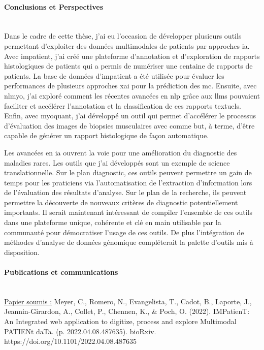 \paragraph{\textbf{Conclusions et Perspectives}}\mbox{}\\

Dans le cadre de cette thèse, j’ai eu l’occasion de développer plusieurs outils permettant d’exploiter des données multimodales de patients par approches \gls{ia}. Avec \gls{impatient}, j’ai créé une plateforme d’annotation et d’exploration de rapports histologiques de patients qui a permis de numériser une centaine de rapports de patients. La base de données d'\gls{impatient} a été utilisée pour évaluer les performances de plusieurs approches \gls{xai} pour la prédiction des \gls{mc}. Ensuite, avec \gls{nlmyo}, j’ai exploré comment les récentes avancées en \gls{nlp} grâce aux \gls{llms} pouvaient faciliter et accélérer l’annotation et la classification de ces rapports textuels. Enfin, avec \gls{myoquant}, j’ai développé un outil qui permet d’accélérer le processus d’évaluation des images de biopsies musculaires avec comme but, à terme, d’être capable de générer un rapport histologique de façon automatique.

Les avancées en \gls{ia} ouvrent la voie pour une amélioration du diagnostic des maladies rares. Les outils que j’ai développés sont un exemple de science translationnelle. Sur le plan diagnostic, ces outils peuvent permettre un gain de temps pour les praticiens via l’automatisation de l’extraction d’information lors de l’évaluation des résultats d’analyse. Sur le plan de la recherche, ils peuvent permettre la découverte de nouveaux critères de diagnostic potentiellement importants. Il serait maintenant intéressant de compiler l’ensemble de ces outils dans une plateforme unique, cohérente et clé en main utilisable par la communauté pour démocratiser l’usage de ces outils. De plus l’intégration de méthodes d’analyse de données génomique compléterait la palette d’outils mis à disposition.

\paragraph{\textbf{Publications et communications}}\mbox{}\\

\underline{Papier soumis :} Meyer, C., Romero, N., Evangelista, T., Cadot, B., Laporte, J., Jeannin-Girardon, A., Collet, P., Chennen, K., \& Poch, O. (2022). IMPatienT: An Integrated web application to digitize, process and explore Multimodal PATIENt daTa. (p. 2022.04.08.487635). bioRxiv. https://doi.org/10.1101/2022.04.08.487635

